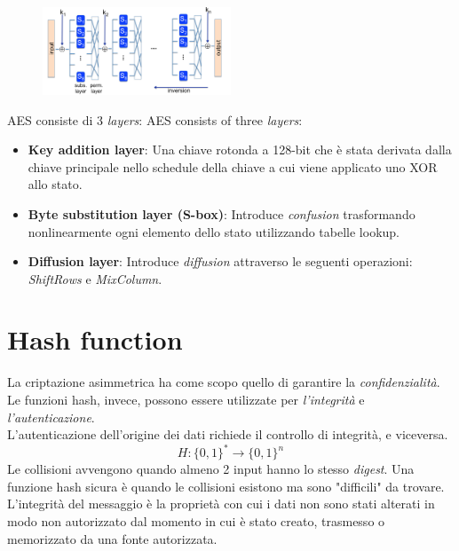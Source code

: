 \documentclass[a4paper,12pt]{article}
\begin{document}
\begin{figure}[H]
  \centering
  \includegraphics[width=0.5\textwidth]{img/aes}
\end{figure}
AES consiste di 3 \textit{layers}:
AES consists of three \textit{layers}:
\begin{itemize}
	\item \textbf{Key addition layer}: Una chiave rotonda a 128-bit che è stata derivata dalla chiave principale nello schedule della chiave a cui viene applicato uno XOR allo stato.
	\item \textbf{Byte substitution layer (S-box)}: Introduce \textit{confusion} trasformando nonlinearmente ogni elemento dello stato utilizzando tabelle lookup.
	\item \textbf{Diffusion layer}: Introduce \textit{diffusion} attraverso le seguenti operazioni: \textit{ShiftRows} e \textit{MixColumn}.
\end{itemize}

\newpage

\section{Hash function}
La criptazione asimmetrica ha come scopo quello di garantire la \textit{confidenzialità}. \\
Le funzioni hash, invece, possono essere utilizzate per \textit{l'integrità} e \textit{l'autenticazione}. \\
L'autenticazione dell'origine dei dati richiede il controllo di integrità, e viceversa.
$$ H : \{0,1\}^* \rightarrow \{0,1\}^n $$
Le collisioni avvengono quando almeno 2 input hanno lo stesso \textit{digest}.
Una funzione hash sicura è quando le collisioni esistono ma sono "difficili" da trovare. \\
L'integrità del messaggio è la proprietà con cui i dati non sono stati alterati in modo non autorizzato dal momento in cui è stato creato, trasmesso o memorizzato da una fonte autorizzata. \\
\end{document}
